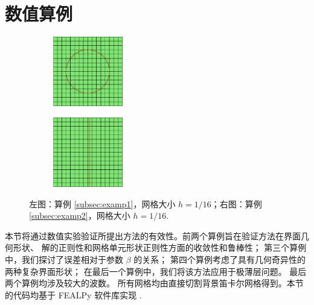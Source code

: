 \section{数值算例}
\begin{figure}[h]
\centering
\begin{subfigure}{.48\textwidth}
\centering
\includegraphics[width=1.2in]{./figures/maxwell/convergence_test.pdf}
\end{subfigure}
\begin{subfigure}{.48\textwidth}
\centering
\includegraphics[width=1.2in]{./figures/maxwell/quadmesh.pdf}
\end{subfigure}
\caption{左图：算例 \ref{subsec:examp1}，网格大小 $h = 1/16$；右图：算例
\ref{subsec:examp2}，网格大小 $h = 1/16$.}
\label{fig:example12}
\end{figure}

本节将通过数值实验验证所提出方法的有效性。前两个算例旨在验证方法在界面几何形状、
解的正则性和网格单元形状正则性方面的收敛性和鲁棒性；
第三个算例中，我们探讨了误差相对于参数 $\beta$ 的关系；
第四个算例考虑了具有几何奇异性的两种复杂界面形状；
在最后一个算例中，我们将该方法应用于极薄层问题。
最后两个算例均涉及较大的波数。
所有网格均由直接切割背景笛卡尔网格得到。本节的代码均基于 FEALPy 
软件库实现 \cite{fealpy}.

